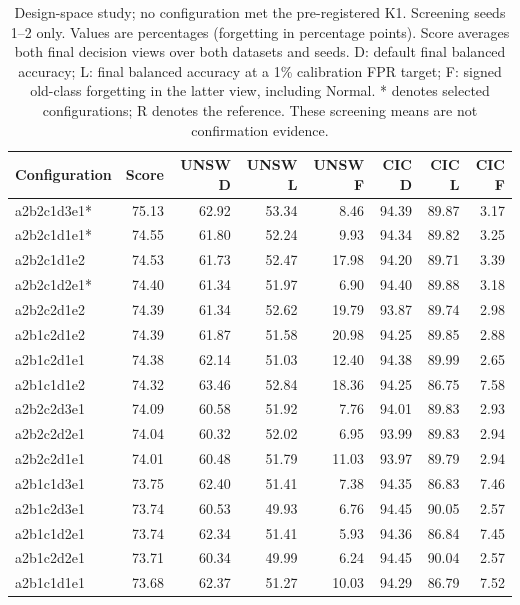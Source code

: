 \begin{table}[p]\centering\scriptsize
\caption{Design-space study; no configuration met the pre-registered K1. Screening seeds 1--2 only. Values are percentages (forgetting in percentage points). Score averages both final decision views over both datasets and seeds. D: default final balanced accuracy; L: final balanced accuracy at a 1\% calibration FPR target; F: signed old-class forgetting in the latter view, including Normal. * denotes selected configurations; R denotes the reference. These screening means are not confirmation evidence.}
\label{tab:design-space-screen}
\begin{tabular}{lrrrrrrr}\toprule
Configuration & Score & UNSW D & UNSW L & UNSW F & CIC D & CIC L & CIC F \\\midrule
a2b2c1d3e1* & 75.13 & 62.92 & 53.34 & 8.46 & 94.39 & 89.87 & 3.17 \\
a2b2c1d1e1* & 74.55 & 61.80 & 52.24 & 9.93 & 94.34 & 89.82 & 3.25 \\
a2b2c1d1e2 & 74.53 & 61.73 & 52.47 & 17.98 & 94.20 & 89.71 & 3.39 \\
a2b2c1d2e1* & 74.40 & 61.34 & 51.97 & 6.90 & 94.40 & 89.88 & 3.18 \\
a2b2c2d1e2 & 74.39 & 61.34 & 52.62 & 19.79 & 93.87 & 89.74 & 2.98 \\
a2b1c2d1e2 & 74.39 & 61.87 & 51.58 & 20.98 & 94.25 & 89.85 & 2.88 \\
a2b1c2d1e1 & 74.38 & 62.14 & 51.03 & 12.40 & 94.38 & 89.99 & 2.65 \\
a2b1c1d1e2 & 74.32 & 63.46 & 52.84 & 18.36 & 94.25 & 86.75 & 7.58 \\
a2b2c2d3e1 & 74.09 & 60.58 & 51.92 & 7.76 & 94.01 & 89.83 & 2.93 \\
a2b2c2d2e1 & 74.04 & 60.32 & 52.02 & 6.95 & 93.99 & 89.83 & 2.94 \\
a2b2c2d1e1 & 74.01 & 60.48 & 51.79 & 11.03 & 93.97 & 89.79 & 2.94 \\
a2b1c1d3e1 & 73.75 & 62.40 & 51.41 & 7.38 & 94.35 & 86.83 & 7.46 \\
a2b1c2d3e1 & 73.74 & 60.53 & 49.93 & 6.76 & 94.45 & 90.05 & 2.57 \\
a2b1c1d2e1 & 73.74 & 62.34 & 51.41 & 5.93 & 94.36 & 86.84 & 7.45 \\
a2b1c2d2e1 & 73.71 & 60.34 & 49.99 & 6.24 & 94.45 & 90.04 & 2.57 \\
a2b1c1d1e1 & 73.68 & 62.37 & 51.27 & 10.03 & 94.29 & 86.79 & 7.52 \\

\end{tabular}
\end{table}
